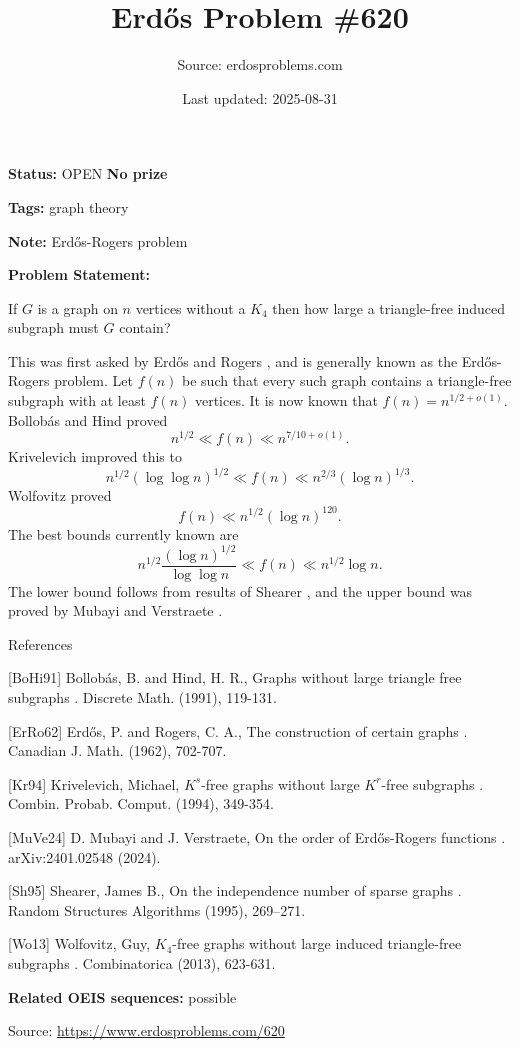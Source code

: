 \documentclass{article}
\title{Erd\H{o}s Problem \#620}
\date{Last updated: 2025-08-31}
\author{Source: erdosproblems.com}
\begin{document}
\maketitle

\noindent\textbf{Status:} OPEN \quad \textbf{No prize}

\noindent\textbf{Tags:} graph theory

\medskip
\noindent\textbf{Note:} Erdős-Rogers problem

\medskip

\noindent\textbf{Problem Statement:}

If $G$ is a graph on $n$ vertices without a $K_4$ then how large a triangle-free induced subgraph must $G$ contain?




This was first asked by Erd\H{o}s and Rogers \cite{ErRo62}, and is generally known as the Erd\H{o}s-Rogers problem. Let $f(n)$ be such that every such graph contains a triangle-free subgraph with at least $f(n)$ vertices. It is now known that $f(n)=n^{1/2+o(1)}$. Bollob\'{a}s and Hind \cite{BoHi91} proved\[n^{1/2} \ll f(n) \ll n^{7/10+o(1)}.\]Krivelevich \cite{Kr94} improved this to\[n^{1/2}(\log\log n)^{1/2} \ll f(n) \ll n^{2/3}(\log n)^{1/3}.\]Wolfovitz \cite{Wo13} proved\[f(n) \ll n^{1/2}(\log n)^{120}.\]The best bounds currently known are\[n^{1/2}\frac{(\log n)^{1/2}}{\log\log n}\ll f(n) \ll n^{1/2}\log n.\]The lower bound follows from results of Shearer \cite{Sh95}, and the upper bound was proved by Mubayi and Verstraete \cite{MuVe24}.




References

[BoHi91] Bollob\'{a}s, B. and Hind, H. R., Graphs without large triangle free subgraphs . Discrete Math. (1991), 119-131.

[ErRo62] Erd\H{o}s, P. and Rogers, C. A., The construction of certain graphs . Canadian J. Math. (1962), 702-707.

[Kr94] Krivelevich, Michael, {$K^s$}-free graphs without large {$K^r$}-free subgraphs . Combin. Probab. Comput. (1994), 349-354.

[MuVe24] D. Mubayi and J. Verstraete, On the order of Erd\H{o}s-Rogers functions . arXiv:2401.02548 (2024).

[Sh95] Shearer, James B., On the independence number of sparse graphs . Random Structures Algorithms (1995), 269--271.

[Wo13] Wolfovitz, Guy, {$K_4$}-free graphs without large induced triangle-free subgraphs . Combinatorica (2013), 623-631.

\noindent\textbf{Related OEIS sequences:} possible


\bigskip
\noindent\small{Source: \url{https://www.erdosproblems.com/620}}
\end{document}
